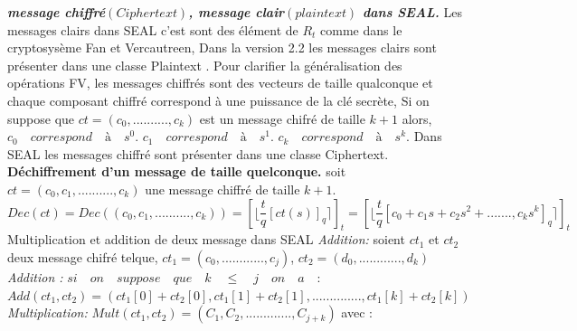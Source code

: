 \documentclass[a4paper,11pt]{report}
\begin{document}
\textbf{\textit{message chiffré$(Ciphertext)$, message clair$(plaintext)$ dans SEAL.}}\newline
Les messages clairs dans SEAL c'est sont des élément de $R_t$ comme dans le cryptosysème Fan et Vercautreen,
Dans la version 2.2 les messages clairs sont présenter dans une classe Plaintext .\newline
Pour clarifier la généralisation des opérations FV, les messages chiffrés sont des vecteurs de taille qualconque et chaque composant chiffré correspond à une puissance de la clé secrète, Si on suppose que $ct = (c_0,..........,c_k)$ est un message chifré de taille $k+1$ alors,\newline
$c_0\quad correspond\quad à\quad s^0.$\newline
$c_1\quad correspond\quad à\quad s^1.$\newline
$c_k\quad correspond\quad à\quad s^k.$
\newline
 Dans SEAL les messages chiffré sont présenter dans une classe Ciphertext.\newline
 \textbf{Déchiffrement d'un message de taille quelconque.}\newline
soit $ct = (c_0, c_1, .........., c_k)$ une message chiffré de taille $k+1.$\newline
$Dec(ct) = Dec((c_0, c_1, .........., c_k)) = [\lfloor\dfrac{t}{q}[ct(s)]_q\rceil]_t = [\lfloor\dfrac{t}{q}[c_0 + c_1s+c_2s^2+.......,c_ks^k]_q\rceil]_t$\newline
Multiplication et addition de deux message dans SEAL\newline
\textit{Addition:}\newline
soient $ct_1$ et $ct_2$ deux message chifré telque,\newline
$ct_1 = (c_0,............,c_j)$, $ct_2 = (d_0,............,d_k)$
\newline
\textit{Addition : }\newline
\newline
$si\quad on\quad suppose\quad que\quad k\quad \leq \quad j\quad on\quad a \quad:$\newline
\newline
$Add(ct_1, ct_2) = (ct_1[0]+ct_2[0],ct_1[1]+ct_2[1],..............,ct_1[k]+ct_2[k])$\newline
\newline
\textit{Multiplication:}\newline
\newline
$Mult(ct_1, ct_2) = (C_1,C_2,............., C_{j+k})$ avec :\newline
\end{document}
